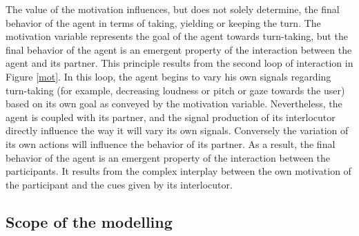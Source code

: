 The value of the motivation influences, but does not solely determine, the final behavior of the agent in terms of taking, yielding or keeping the turn. The motivation variable represents the goal of the agent towards turn-taking, but the final behavior of the agent is an emergent property of the interaction between the agent and its partner. 
This principle results from the second loop of interaction in Figure \ref{mot}. 
In this loop, the agent begins to vary his own signals regarding turn-taking (for example, decreasing loudness or pitch or gaze towards the user) based on its own goal as conveyed by the motivation variable. Nevertheless, the agent is coupled with its partner, and the signal production of its interlocutor directly influence the way it will vary its own signals.
Conversely the variation of its own actions will influence the behavior of its partner. 
As a result, the final behavior of the agent
is an emergent property of the interaction between the participants.
It results from the complex interplay between the own motivation of the participant and the cues given by its interlocutor.

\subsection{Scope of the modelling}

